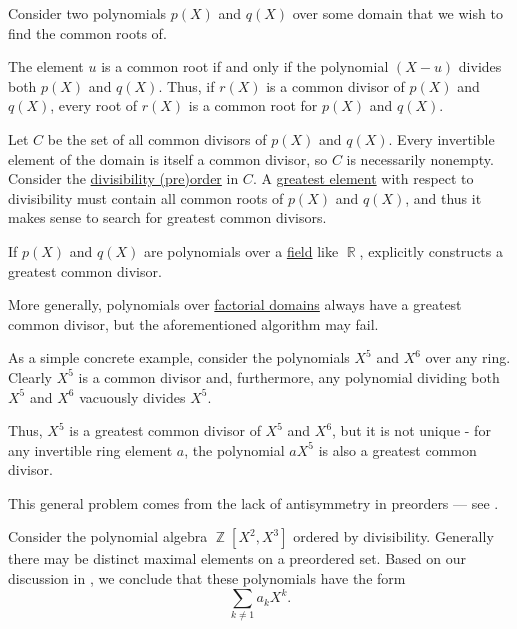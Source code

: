 \begin{example}\label{ex:common_polynomial_divisors}
  Consider two polynomials \( p(X) \) and \( q(X) \) over some domain that we wish to find the common roots of.

  The element \( u \) is a common root if and only if the polynomial \( (X - u) \) divides both \( p(X) \) and \( q(X) \). Thus, if \( r(X) \) is a common divisor of \( p(X) \) and \( q(X) \), every root of \( r(X) \) is a common root for \( p(X) \) and \( q(X) \).

  Let \( C \) be the set of all common divisors of \( p(X) \) and \( q(X) \). Every invertible element of the domain is itself a common divisor, so \( C \) is necessarily nonempty. Consider the \hyperref[thm:semiring_divisibility_order]{divisibility (pre)order} in \( C \). A \hyperref[def:extremal_points/greatest_and_least]{greatest element} with respect to divisibility must contain all common roots of \( p(X) \) and \( q(X) \), and thus it makes sense to search for greatest common divisors.

  \begin{thmenum}
     If \( p(X) \) and \( q(X) \) are polynomials over a \hyperref[def:field]{field} like \( \BbbR \),  explicitly constructs a greatest common divisor.

     More generally, polynomials over \hyperref[def:factorial_domain]{factorial domains} always have a greatest common divisor, but the aforementioned algorithm may fail.

     As a simple concrete example, consider the polynomials \( X^5 \) and \( X^6 \) over any ring. Clearly \( X^5 \) is a common divisor and, furthermore, any polynomial dividing both \( X^5 \) and \( X^6 \) vacuously divides \( X^5 \).

    Thus, \( X^5 \) is a greatest common divisor of \( X^5 \) and \( X^6 \), but it is not unique - for any invertible ring element \( a \), the polynomial \( a X^5 \) is also a greatest common divisor.

    This general problem comes from the lack of antisymmetry in preorders --- see .

     Consider the polynomial algebra \( \BbbZ[X^2, X^3] \) ordered by divisibility. Generally there may be distinct maximal elements on a preordered set. Based on our discussion in , we conclude that these polynomials have the form
    \begin{equation*}
      \sum_{k \neq 1} a_k X^k.
    \end{equation*}


\end{thmenum}
\end{example}
